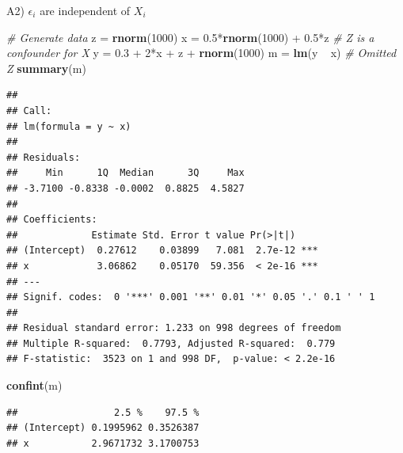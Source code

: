 \documentclass[12pt,ignorenonframetext,]{beamer}
\newenvironment{Shaded}{\begin{snugshade}}{\end{snugshade}}
\newcommand{\KeywordTok}[1]{\textcolor[rgb]{0.13,0.29,0.53}{\textbf{{#1}}}}
\newcommand{\DecValTok}[1]{\textcolor[rgb]{0.00,0.00,0.81}{{#1}}}
\newcommand{\FloatTok}[1]{\textcolor[rgb]{0.00,0.00,0.81}{{#1}}}
\newcommand{\StringTok}[1]{\textcolor[rgb]{0.31,0.60,0.02}{{#1}}}
\newcommand{\CommentTok}[1]{\textcolor[rgb]{0.56,0.35,0.01}{\textit{{#1}}}}
\newcommand{\NormalTok}[1]{{#1}}
\begin{document}
\begin{frame}[fragile]{A2) \(\epsilon_i\) are independent of \(X_i\)}

\tiny

\begin{Shaded}
\begin{Highlighting}[]
\CommentTok{# Generate data}
\NormalTok{z =}\StringTok{ }\KeywordTok{rnorm}\NormalTok{(}\DecValTok{1000}\NormalTok{)}
\NormalTok{x =}\StringTok{ }\FloatTok{0.5}\NormalTok{*}\KeywordTok{rnorm}\NormalTok{(}\DecValTok{1000}\NormalTok{) +}\StringTok{ }\FloatTok{0.5}\NormalTok{*z }\CommentTok{# Z is a confounder for X}
\NormalTok{y =}\StringTok{ }\FloatTok{0.3} \NormalTok{+}\StringTok{ }\DecValTok{2}\NormalTok{*x +}\StringTok{ }\NormalTok{z +}\StringTok{ }\KeywordTok{rnorm}\NormalTok{(}\DecValTok{1000}\NormalTok{)}
\NormalTok{m =}\StringTok{ }\KeywordTok{lm}\NormalTok{(y ~}\StringTok{ }\NormalTok{x) }\CommentTok{# Omitted Z}
\KeywordTok{summary}\NormalTok{(m)}
\end{Highlighting}
\end{Shaded}

\begin{verbatim}
## 
## Call:
## lm(formula = y ~ x)
## 
## Residuals:
##     Min      1Q  Median      3Q     Max 
## -3.7100 -0.8338 -0.0002  0.8825  4.5827 
## 
## Coefficients:
##             Estimate Std. Error t value Pr(>|t|)    
## (Intercept)  0.27612    0.03899   7.081  2.7e-12 ***
## x            3.06862    0.05170  59.356  < 2e-16 ***
## ---
## Signif. codes:  0 '***' 0.001 '**' 0.01 '*' 0.05 '.' 0.1 ' ' 1
## 
## Residual standard error: 1.233 on 998 degrees of freedom
## Multiple R-squared:  0.7793, Adjusted R-squared:  0.779 
## F-statistic:  3523 on 1 and 998 DF,  p-value: < 2.2e-16
\end{verbatim}

\begin{Shaded}
\begin{Highlighting}[]
\KeywordTok{confint}\NormalTok{(m)}
\end{Highlighting}
\end{Shaded}

\begin{verbatim}
##                 2.5 %    97.5 %
## (Intercept) 0.1995962 0.3526387
## x           2.9671732 3.1700753
\end{verbatim}

\normalsize

\end{frame}
\end{document}
